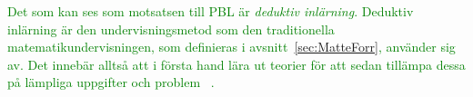 \textcolor{green}{Det som kan ses som motsatsen till PBL är \textit{deduktiv inlärning}. Deduktiv inlärning är den undervisningsmetod som den traditionella matematikundervisningen, som definieras i avsnitt~\ref{sec:MatteForr}, använder sig av. Det innebär alltså att i första hand lära ut teorier för att sedan tillämpa dessa på lämpliga uppgifter och problem ~\cite{deduktivInlärning}.}


